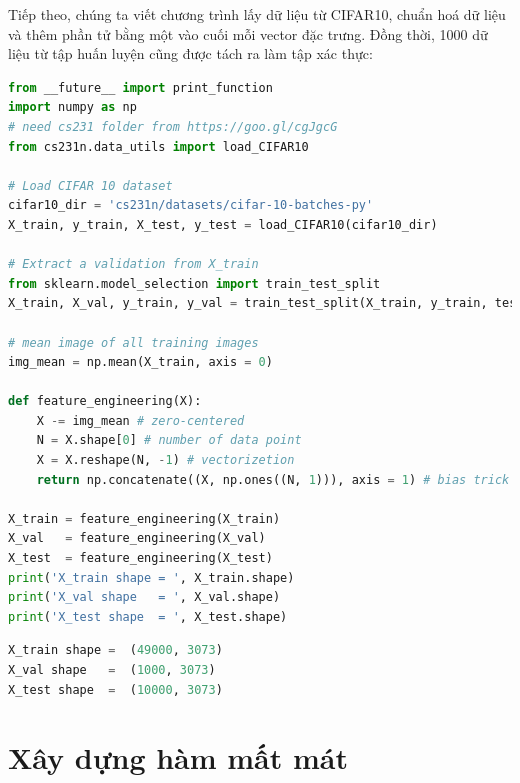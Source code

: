 Tiếp theo, chúng ta viết chương trình lấy dữ liệu từ CIFAR10, chuẩn hoá dữ
liệu và thêm phần tử bằng một vào cuối mỗi vector đặc trưng. Đồng thời, 1000 dữ liệu từ tập huấn luyện cũng được tách ra làm tập xác thực:

\begin{lstlisting}[language=Python]
from __future__ import print_function 
import numpy as np
# need cs231 folder from https://goo.gl/cgJgcG
from cs231n.data_utils import load_CIFAR10 

# Load CIFAR 10 dataset
cifar10_dir = 'cs231n/datasets/cifar-10-batches-py'
X_train, y_train, X_test, y_test = load_CIFAR10(cifar10_dir)

# Extract a validation from X_train 
from sklearn.model_selection import train_test_split
X_train, X_val, y_train, y_val = train_test_split(X_train, y_train, test_size= 1000)

# mean image of all training images
img_mean = np.mean(X_train, axis = 0)

def feature_engineering(X):
    X -= img_mean # zero-centered
    N = X.shape[0] # number of data point 
    X = X.reshape(N, -1) # vectorizetion 
    return np.concatenate((X, np.ones((N, 1))), axis = 1) # bias trick 

X_train = feature_engineering(X_train)
X_val   = feature_engineering(X_val)
X_test  = feature_engineering(X_test)
print('X_train shape = ', X_train.shape)
print('X_val shape   = ', X_val.shape)
print('X_test shape  = ', X_test.shape)
\end{lstlisting}

\kq 
\begin{lstlisting}[language=Python]
X_train shape =  (49000, 3073)
X_val shape   =  (1000, 3073)
X_test shape  =  (10000, 3073)
\end{lstlisting}
\section{Xây dựng hàm mất mát }
 
 


